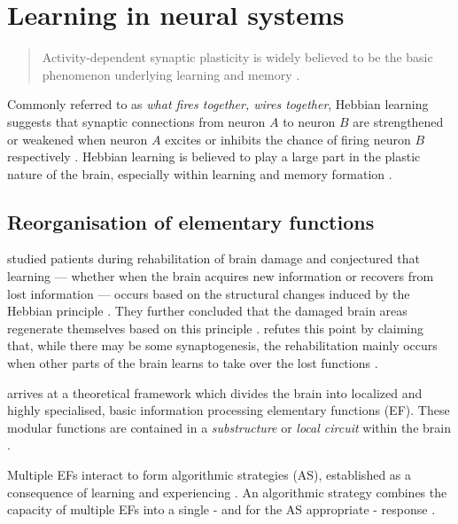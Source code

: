 \documentclass[a4paper,oneside]{memoir}
\begin{document}
\section{Learning in neural systems}
\begin{quote}
  Activity-dependent synaptic plasticity is widely believed to be the basic
  phenomenon underlying learning and memory \autocite{dayan2001}.
\end{quote}

Commonly referred to as \textit{what fires together, wires together}, Hebbian
learning suggests that synaptic connections from neuron $A$ to neuron $B$
are strengthened or weakened when neuron $A$ excites or inhibits the chance of
firing neuron $B$ respectively \autocite{dayan2001}.
Hebbian learning is believed to play a large part in the plastic nature of the
brain, especially within learning and memory formation
\autocite{dayan2001, Johnston2009, Robertson1999}.

\subsection{Reorganisation of elementary functions}
\label{ref}

\autocite{Robertson1999} studied patients during
rehabilitation of brain damage and conjectured that learning --- whether when the
brain acquires new information or recovers from lost information --- occurs based
on the structural changes induced by the Hebbian principle
\autocite{Robertson1999}. They further concluded that the damaged brain areas
regenerate themselves based on this principle \autocite{Robertson1999}.
\autocite{Mogensen2011} refutes this point by claiming that, while there
may be some synaptogenesis, the rehabilitation mainly occurs when other parts
of the brain learns to take over the lost functions \autocite{Mogensen2011}.

\autocite{Mogensen2011} arrives at a theoretical framework which divides the
brain into localized and highly specialised, basic information
processing elementary functions (EF). These modular functions are contained
in a \textit{substructure} or \textit{local circuit}
within the brain \autocite{Mogensen2011}.

Multiple EFs interact to form algorithmic strategies (AS), established as
a consequence of learning and experiencing \autocite{Mogensen2011}. An
algorithmic strategy combines the capacity of multiple EFs into a single - and
for the AS appropriate - response \autocite{Mogensen2011, Mogensen2012b}.
\end{document}
